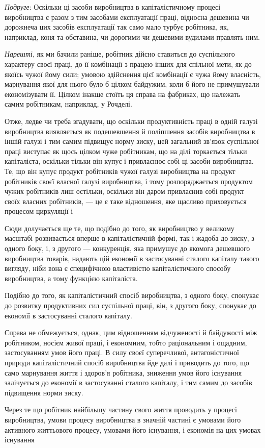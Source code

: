 
\emph{Подруге}: Оскільки ці засоби виробництва в капіталістичному
процесі виробництва є разом з тим засобами експлуатації праці,
відносна дешевина чи дорожнеча цих засобів експлуатації так
само мало турбує робітника, як, наприклад, коня та обставина,
чи дорогими чи дешевими вудилами правлять ним.

\emph{Нарешті}, як ми бачили раніше, робітник дійсно ставиться
до суспільного характеру своєї праці, до її комбінації з працею
інших для спільної мети, як до якоїсь чужої йому сили; умовою
здійснення цієї комбінації є чужа йому власність, марнування
якої для нього було б цілком байдужим, коли б його не примушували
економізувати її. Цілком інакше стоїть ця справа
на фабриках, що належать самим робітникам, наприклад, у Рочделі.

Отже, ледве чи треба згадувати, що оскільки продуктивність
праці в одній галузі виробництва виявляється як подешевшення
й поліпшення засобів виробництва в іншій галузі і тим самим
підвищує норму зиску, цей загальний зв’язок суспільної праці
виступає як щось цілком чуже робітникам, що на ділі торкається
тільки капіталіста, оскільки тільки він купує і привласнює
собі ці засоби виробництва. Те, що він купує продукт робітників чужої галузі виробництва на продукт
робітників своєї власної галузі виробництва, і тому розпоряджається продуктом чужих робітників лиш
остільки, оскільки він даром привласнив собі продукт своїх власних робітників, — це є таке
відношення,
яке щасливо приховується процесом циркуляції і~

Сюди долучається ще те, що подібно до того, як виробництво у великому масштабі розвивається вперше в
капіталістичній формі, так і жадоба до зиску, з одного боку, і, з другого — конкуренція, яка
примушує до якомога дешевшого виробництва товарів, надають цій економії в застосуванні сталого
капіталу такого вигляду, ніби вона є специфічною властивістю
капіталістичного способу виробництва, а тому функцією капіталіста.

Подібно до того, як капіталістичний спосіб виробництва,
з одного боку, спонукає до розвитку продуктивних сил суспільної праці, він, з другого боку, спонукає
до економії в застосуванні сталого капіталу.

Справа не обмежується, однак, цим відношенням відчуженості
й байдужості між робітником, носієм живої праці, і економним,
тобто раціональним і ощадним, застосуванням умов його праці.
В силу своєї суперечливої, антагоністичної природи капіталістичний спосіб виробництва йде далі і
приводить до того, що само
марнування життя і здоров’я робітника, зниження умов його
існування залічується до економії в застосуванні сталого капіталу, і тим самим до засобів підвищення
норми зиску.

Через те що робітник найбільшу частину свого життя проводить у процесі виробництва, умови процесу
виробництва
в значній частині є умовами його активного життьового процесу, умовами його існування, і економія на
цих умовах існування
\parbreak{}  %
